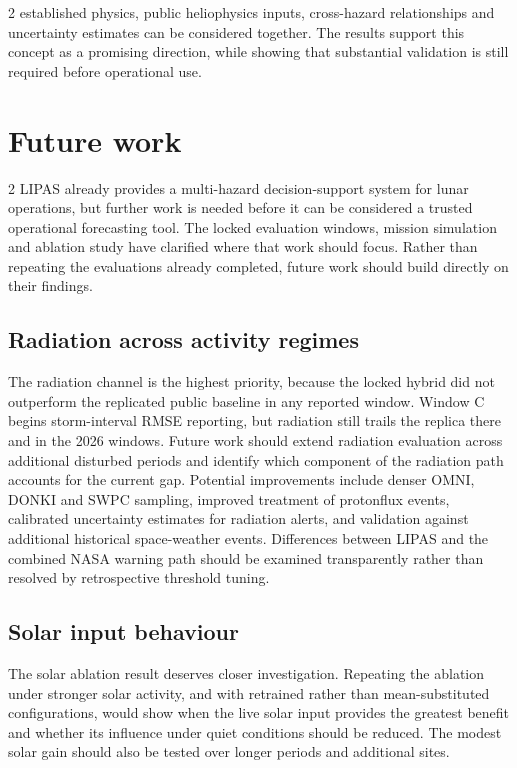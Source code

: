 \begin{multicols}{2}
established physics, public heliophysics inputs, cross-hazard relationships and uncertainty estimates can be considered together. The results support this concept as a promising direction, while showing that substantial validation is still required before operational use.
\end{multicols}
\section{Future work}
\begin{multicols}{2}
LIPAS already provides a multi-hazard decision-support system for lunar operations, but further work is needed before it can be considered a trusted operational forecasting tool. The locked evaluation windows, mission simulation and ablation study have clarified where that work should focus. Rather than repeating the evaluations already completed, future work should build directly on their findings.

\subsection{Radiation across activity regimes}

The radiation channel is the highest priority, because the locked hybrid did not outperform the replicated public baseline in any reported window. Window C begins storm-interval RMSE reporting, but radiation still trails the replica there and in the 2026 windows. Future work should extend radiation evaluation across additional disturbed periods and identify which component of the radiation path accounts for the current gap. Potential improvements include denser OMNI, DONKI and SWPC sampling, improved treatment of protonflux events, calibrated uncertainty estimates for radiation alerts, and validation against additional historical space-weather events. Differences between LIPAS and the combined NASA warning path should be examined transparently rather than resolved by retrospective threshold tuning.

\subsection{Solar input behaviour}

The solar ablation result deserves closer investigation. Repeating the ablation under stronger solar activity, and with retrained rather than mean-substituted configurations, would show when the live solar input provides the greatest benefit and whether its influence under quiet conditions should be reduced. The modest solar gain should also be tested over longer periods and additional sites.


\end{multicols}
